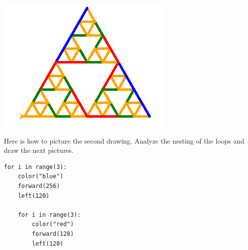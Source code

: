 \documentclass[11pt,class=report,crop=false]{standalone}
\begin{document}
\begin{activite}
\begin{center}
\includegraphics[scale=\myscale,scale=0.3]{screen-turtle-4d}
\end{center}

Here is how to picture the second drawing. Analyze the nesting of the loops and draw the next pictures.

\begin{center}
\begin{minipage}{0.5\textwidth}
\begin{lstlisting}
for i in range(3):
    color("blue")
    forward(256)
    left(120)

    for i in range(3):
        color("red")
        forward(128)
        left(120)
\end{lstlisting}        
\end{minipage}
\end{center}        
\end{activite}



\end{document}

